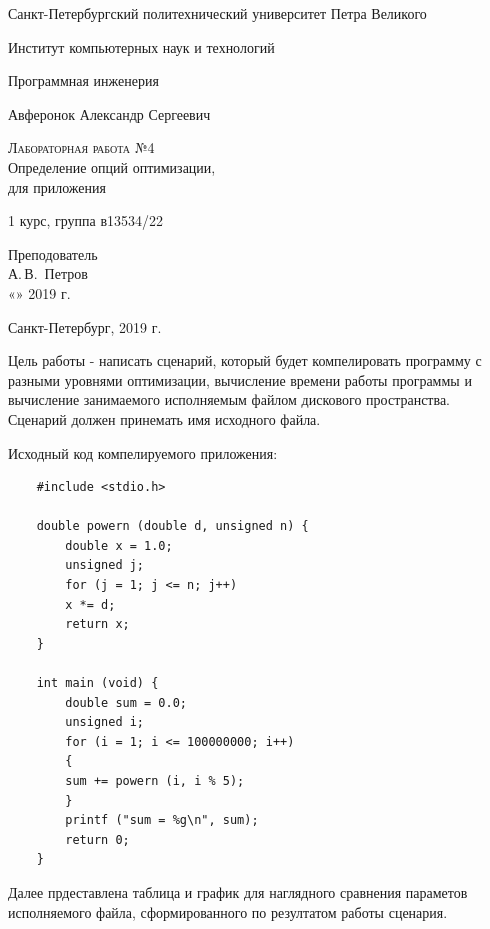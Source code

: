 \documentclass[12pt,a4paper]{scrartcl}
\begin{document}
\begin{titlepage}
  \begin{center}
    \large




    \vspace{0.5cm}

    Санкт-Петербургский политехнический университет Петра Великого
    \vspace{0.25cm}
    
    Институт компьютерных наук и технологий
    
    Программная инженерия
    \vfill
    
    
    Авферонок Александр Сергеевич
    \vfill

    \textsc{Лабораторная работа №4}\\[5mm]
    
    {\LARGE Определение опций оптимизации,\\
      для приложения}
  \bigskip
    
    1 курс, группа в13534/22
\end{center}
\vfill

\newlength{\ML}
\hfill\begin{minipage}{0.4\textwidth}
  Преподователь\\
  \underline{\hspace{\ML}} А.\,В.~Петров\\
  «\underline{\hspace{0.7cm}}» \underline{\hspace{2cm}} 2019 г.
\end{minipage}%
\bigskip
\vfill

\begin{center}
  Санкт-Петербург, 2019 г.
\end{center}
\end{titlepage}
\newpage
Цель работы - написать сценарий, который будет компелировать программу с разными уровнями оптимизации, 
вычисление времени работы программы и вычисление занимаемого исполняемым файлом дискового пространства.
Сценарий должен принемать имя исходного файла.
\par
Исходный код компелируемого приложения:
\begin{verbatim}
    #include <stdio.h>
    
    double powern (double d, unsigned n) {
        double x = 1.0;
        unsigned j;
        for (j = 1; j <= n; j++)
	    x *= d;
        return x;
    }

    int main (void) {
        double sum = 0.0;
        unsigned i;
        for (i = 1; i <= 100000000; i++)
        {
	    sum += powern (i, i % 5);
        }
        printf ("sum = %g\n", sum);
        return 0;
    }
\end{verbatim}
Далее прдеставлена таблица и график для наглядного сравнения параметов исполняемого файла, сформированного по резултатом работы сценария.
\end{document}
